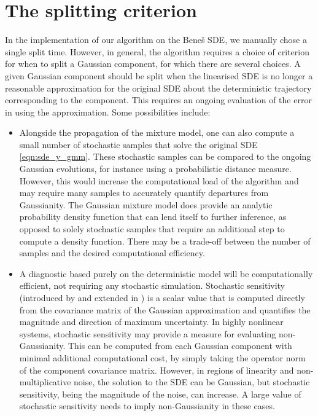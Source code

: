 \section{The splitting criterion}\label{sec:gmm_split_disc}
In the implementation of our algorithm on the Bene\v{s} SDE, we manually chose a single split time.
However, in general, the algorithm requires a choice of criterion for when to split a Gaussian component, for which there are several choices.
A given Gaussian component should be split when the linearised SDE is no longer a reasonable approximation for the original SDE about the deterministic trajectory corresponding to the component.
This requires an ongoing evaluation of the error in using the approximation.
Some possibilities include:
\begin{itemize}
	\item Alongside the propagation of the mixture model, one can also compute a small number of stochastic samples that solve the original SDE \cref{eqn:sde_y_gmm}.
	      These stochastic samples can be compared to the ongoing Gaussian evolutions, for instance using a probabilistic distance measure.
	      However, this would increase the computational load of the algorithm and may require many samples to accurately quantify departures from Gaussianity.
	      The Gaussian mixture model does provide an analytic probability density function that can lend itself to further inference, as opposed to solely stochastic samples that require an additional step to compute a density function.
	      There may be a trade-off between the number of samples and the desired computational efficiency.

	\item A diagnostic based purely on the deterministic model will be computationally efficient, not requiring any stochastic simulation.
	      Stochastic sensitivity (introduced by \citet{Balasuriya_2020_StochasticSensitivityComputable} and extended in ) is a scalar value that is computed directly from the covariance matrix of the Gaussian approximation and quantifies the magnitude and direction of maximum uncertainty.
	      In highly nonlinear systems, stochastic sensitivity may provide a measure for evaluating non-Gaussianity.
	      This can be computed from each Gaussian component with minimal additional computational cost, by simply taking the operator norm of the component covariance matrix.
	      However, in regions of linearity and non-multiplicative noise, the solution to the SDE can be Gaussian, but stochastic sensitivity, being the magnitude of the noise, can increase.
	      A large value of stochastic sensitivity needs to imply non-Gaussianity in these cases.



\end{itemize}
